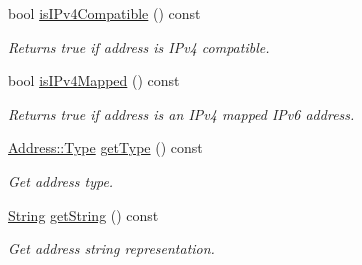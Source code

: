 \begin{DoxyCompactItemize}
bool \hyperlink{classostk_1_1io_1_1ip_1_1_address_a3a555f0509c7ec00ed45fbd09f993414}{is\+I\+Pv4\+Compatible} () const
\begin{DoxyCompactList}\small\item\em Returns true if address is I\+Pv4 compatible. \end{DoxyCompactList}\item 
bool \hyperlink{classostk_1_1io_1_1ip_1_1_address_a3967d2bd177d2d14d8245e714af328da}{is\+I\+Pv4\+Mapped} () const
\begin{DoxyCompactList}\small\item\em Returns true if address is an I\+Pv4 mapped I\+Pv6 address. \end{DoxyCompactList}\item 
\hyperlink{classostk_1_1io_1_1ip_1_1_address_a03b78ae8f7ddbb893d7396e6a1baf695}{Address\+::\+Type} \hyperlink{classostk_1_1io_1_1ip_1_1_address_ab1e396075b2db78542e9312479c9a9a5}{get\+Type} () const
\begin{DoxyCompactList}\small\item\em Get address type. \end{DoxyCompactList}\item 
\hyperlink{namespaceostk_1_1io_1_1ip_a987b35b1bc61a18b66c2a45f9ce5536e}{String} \hyperlink{classostk_1_1io_1_1ip_1_1_address_a3dde4b2601d3c2be6a6ab6af3663fa1a}{get\+String} () const
\begin{DoxyCompactList}\small\item\em Get address string representation. \end{DoxyCompactList}\end{DoxyCompactItemize}
